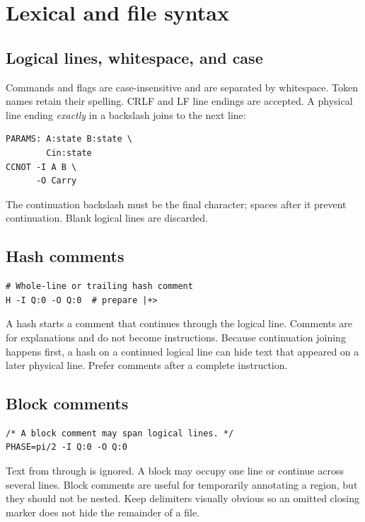 \section{Lexical and file syntax}

\subsection{Logical lines, whitespace, and case}

Commands and flags are case-insensitive and are separated by whitespace.
Token names retain their spelling. CRLF and LF line endings are accepted.
A physical line ending \emph{exactly} in a backslash joins to the next line:

\begin{lstlisting}
PARAMS: A:state B:state \
        Cin:state
CCNOT -I A B \
      -O Carry
\end{lstlisting}

The continuation backslash must be the final character; spaces after it prevent
continuation. Blank logical lines are discarded.

\subsection{Hash comments}

\begin{lstlisting}
# Whole-line or trailing hash comment
H -I Q:0 -O Q:0  # prepare |+>
\end{lstlisting}
A hash starts a comment that continues through the logical line. Comments are
for explanations and do not become instructions. Because continuation joining
happens first, a hash on a continued logical line can hide text that appeared
on a later physical line. Prefer comments after a complete instruction.

\subsection{Block comments}

\begin{lstlisting}
/* A block comment may span logical lines. */
PHASE=pi/2 -I Q:0 -O Q:0
\end{lstlisting}

Text from \code{/*} through \code{*/} is ignored. A block may occupy one line
or continue across several lines. Block comments are useful for temporarily
annotating a region, but they should not be nested. Keep delimiters visually
obvious so an omitted closing marker does not hide the remainder of a file.

